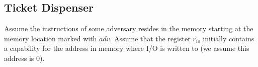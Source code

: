 \documentclass{article}
\newcommand{\var}[1]{\mathit{#1}}
\newcommand{\codelabel}[1]{\mathit{#1}}
\begin{document}
\subsection{Ticket Dispenser}
\label{sec:tick-disp}
\newcommand{\size}{\var{size}}
\newcommand{\rio}{r_{io}}
\newcommand{\mrlen}{5cm}
\newcommand{\bracket}[1]{\multirow{#1}{*}{\ensuremath{
 \left . \vphantom{\begin{array}{l}
 \ifthenelse{\equal{#1}{1}}{3\\}{
    \ifthenelse{\equal{#1}{2}}{3\\3\\}{
    \ifthenelse{\equal{#1}{3}}{3\\3\\3\\}{
    \ifthenelse{\equal{#1}{4}}{3\\3\\3\\3\\}{
    \ifthenelse{\equal{#1}{5}}{3\\3\\3\\3\\3\\}{
    \ifthenelse{\equal{#1}{6}}{3\\3\\3\\3\\3\\3\\}{
      3\\3\\3\\3\\3\\3\\3\\ %
  }}}}}}
  \end{array}} \right \}}}
}
\newcommand{\annotate}[2]{\multirow{#1}{\mrlen}{\scriptsize #2}}
Assume the instructions of some adversary resides in the memory starting at the memory location marked with $\codelabel{adv}$. Assume that the register $\rio$ initially contains a capability for the address in memory where I/O is written to (we assume this address is 0).
\end{document}
